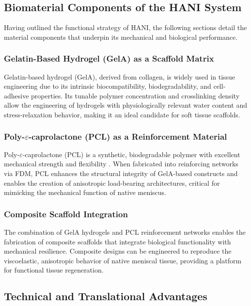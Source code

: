 \subsection{Biomaterial Components of the HANI System}

Having outlined the functional strategy of HANI, the following sections detail the material components that underpin its mechanical and biological performance.

\subsubsection{Gelatin-Based Hydrogel (GelA) as a Scaffold Matrix}

Gelatin-based hydrogel (GelA), derived from collagen, is widely used in tissue engineering due to its intrinsic biocompatibility, biodegradability, and cell-adhesive properties. Its tunable polymer concentration and crosslinking density allow the engineering of hydrogels with physiologically relevant water content and stress-relaxation behavior, making it an ideal candidate for soft tissue scaffolds.

\subsubsection{Poly-$\varepsilon$-caprolactone (PCL) as a Reinforcement Material}

Poly-$\varepsilon$-caprolactone (PCL) is a synthetic, biodegradable polymer with excellent mechanical strength and flexibility \cite{cipitria2011designfabrication}. When fabricated into reinforcing networks via FDM, PCL enhances the structural integrity of GelA-based constructs and enables the creation of anisotropic load-bearing architectures, critical for mimicking the mechanical function of native meniscus.

\subsubsection{Composite Scaffold Integration}

The combination of GelA hydrogels and PCL reinforcement networks enables the fabrication of composite scaffolds that integrate biological functionality with mechanical resilience. Composite designs can be engineered to reproduce the viscoelastic, anisotropic behavior of native meniscal tissue, providing a platform for functional tissue regeneration.

\subsection{Technical and Translational Advantages}


